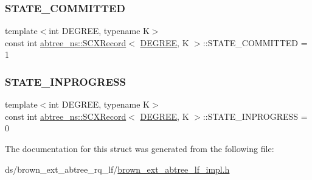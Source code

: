 \mbox{\label{structabtree__ns_1_1SCXRecord_acacd3de85ca93c1a139153163fe9d908}} 
\subsubsection{\texorpdfstring{S\+T\+A\+T\+E\+\_\+\+C\+O\+M\+M\+I\+T\+T\+ED}{STATE\_COMMITTED}}
{\footnotesize\ttfamily template$<$int D\+E\+G\+R\+EE, typename K$>$ \\
const int \hyperlink{structabtree__ns_1_1SCXRecord}{abtree\+\_\+ns\+::\+S\+C\+X\+Record}$<$ \hyperlink{brown__sigouin__abtree__kcas_2adapter_8h_a5d88b17d70c985f2f2b8e987037fd6dd}{D\+E\+G\+R\+EE}, K $>$\+::S\+T\+A\+T\+E\+\_\+\+C\+O\+M\+M\+I\+T\+T\+ED = 1\hspace{0.3cm}{\ttfamily [static]}}

\mbox{\label{structabtree__ns_1_1SCXRecord_a23c9d7401344db0f79a0f504d483b816}} 
\subsubsection{\texorpdfstring{S\+T\+A\+T\+E\+\_\+\+I\+N\+P\+R\+O\+G\+R\+E\+SS}{STATE\_INPROGRESS}}
{\footnotesize\ttfamily template$<$int D\+E\+G\+R\+EE, typename K$>$ \\
const int \hyperlink{structabtree__ns_1_1SCXRecord}{abtree\+\_\+ns\+::\+S\+C\+X\+Record}$<$ \hyperlink{brown__sigouin__abtree__kcas_2adapter_8h_a5d88b17d70c985f2f2b8e987037fd6dd}{D\+E\+G\+R\+EE}, K $>$\+::S\+T\+A\+T\+E\+\_\+\+I\+N\+P\+R\+O\+G\+R\+E\+SS = 0\hspace{0.3cm}{\ttfamily [static]}}



The documentation for this struct was generated from the following file\+:\begin{DoxyCompactItemize}
\item 
ds/brown\+\_\+ext\+\_\+abtree\+\_\+rq\+\_\+lf/\hyperlink{brown__ext__abtree__rq__lf_2brown__ext__abtree__lf__impl_8h}{brown\+\_\+ext\+\_\+abtree\+\_\+lf\+\_\+impl.\+h}\end{DoxyCompactItemize}
